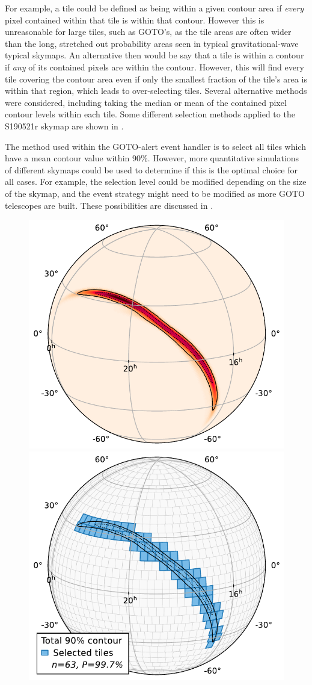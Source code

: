 \begin{colsection}
\begin{colsection}
For example, a tile could be defined as being within a given contour area if \textit{every} pixel contained within that tile is within that contour. However this is unreasonable for large tiles, such as GOTO's, as the tile areas are often wider than the long, stretched out probability areas seen in typical gravitational-wave typical skymaps. An alternative then would be say that a tile is within a contour if \textit{any} of its contained pixels are within the contour. However, this will find every tile covering the contour area even if only the smallest fraction of the tile's area is within that region, which leads to over-selecting tiles. Several alternative methods were considered, including taking the median or mean of the contained pixel contour levels within each tile. Some different selection methods applied to the S190521r skymap are shown in .

The method used within the GOTO-alert event handler is to select all tiles which have a mean contour value within 90\%. However, more quantitative simulations of different skymaps could be used to determine if this is the optimal choice for all cases. For example, the selection level could be modified depending on the size of the skymap, and the event strategy might need to be modified as more GOTO telescopes are built. These possibilities are discussed in .

\begin{figure}[p]
    \begin{center}
        \includegraphics[width=0.49\linewidth]{images/tiling/S190521r_1.pdf}
        \includegraphics[width=0.49\linewidth]{images/tiling/S190521r_2.pdf}


\end{center}
\end{figure}
\end{colsection}
\end{colsection}
